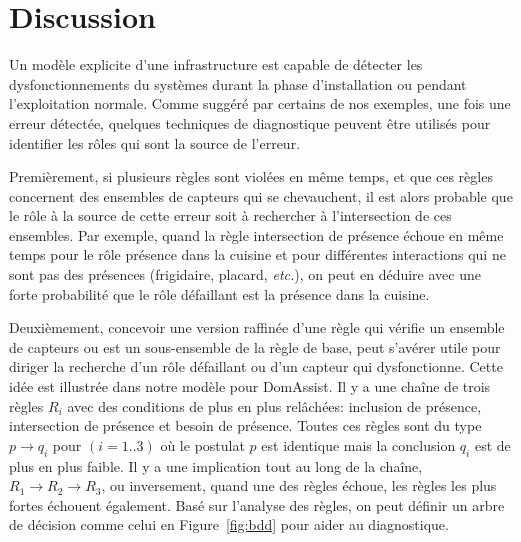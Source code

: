 \section{Discussion}\label{sec:discussion}
Un modèle explicite d'une infrastructure est capable de détecter les dysfonctionnements du systèmes durant la phase d'installation ou pendant l'exploitation normale. Comme suggéré par certains de nos exemples, une fois une erreur détectée, quelques techniques de diagnostique peuvent être utilisés pour identifier les rôles qui sont la source de l'erreur.  

Premièrement, si plusieurs règles sont violées en même temps, et que ces règles concernent des ensembles de capteurs qui se chevauchent, il est alors probable que le rôle à la source de cette erreur soit à rechercher à l'intersection de ces ensembles. Par exemple, quand la règle intersection de présence échoue en même temps pour le rôle présence dans la cuisine et pour différentes interactions qui ne sont pas des présences (frigidaire, placard, {\em etc.}), on peut en déduire avec une forte probabilité que le rôle défaillant est la présence dans la cuisine. 

Deuxièmement, concevoir une version raffinée d'une règle qui vérifie un ensemble de capteurs ou est un sous-ensemble de la règle de base, peut s'avérer utile pour diriger la recherche d'un rôle défaillant ou d'un capteur qui dysfonctionne. Cette idée est illustrée dans notre modèle pour DomAssist. Il y a une chaîne de trois règles $R_i$ avec des conditions de plus en plus relâchées: inclusion de présence, intersection de présence et besoin de présence. Toutes ces règles sont du type $p \rightarrow q_i$ pour $(i=1..3)$ où le postulat $p$ est identique mais la conclusion $q_i$ est de plus en plus faible. Il y a une implication tout au long de la chaîne, $R_1 \rightarrow R_2 \rightarrow R_3$, ou inversement, quand une des règles échoue, les règles les plus fortes échouent également. Basé sur l'analyse des règles, on peut définir un arbre de décision comme celui en Figure~\ref{fig:bdd} pour aider au diagnostique.


